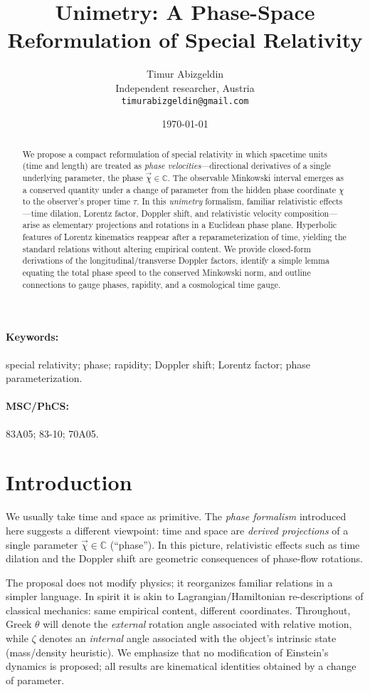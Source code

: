 \documentclass[11pt]{article}
\title{Unimetry: A Phase-Space Reformulation of Special Relativity}
\author{Timur Abizgeldin\\ \small Independent researcher, Austria\\ \small \texttt{timurabizgeldin@gmail.com}}
\date{\today}
\numberwithin{equation}{section}
\begin{document}
\maketitle

\begin{abstract}
We propose a compact reformulation of special relativity in which spacetime units (time and length) are treated as \emph{phase velocities}---directional derivatives of a single underlying parameter, the phase $\vec{\chi}\in\mathbb{C}$. The observable Minkowski interval emerges as a conserved quantity under a change of parameter from the hidden phase coordinate $\chi$ to the observer's proper time $\tau$. In this \emph{unimetry} formalism, familiar relativistic effects---time dilation, Lorentz factor, Doppler shift, and relativistic velocity composition---arise as elementary projections and rotations in a Euclidean phase plane. Hyperbolic features of Lorentz kinematics reappear after a reparameterization of time, yielding the standard relations without altering empirical content. We provide closed-form derivations of the longitudinal/transverse Doppler factors, identify a simple lemma equating the total phase speed to the conserved Minkowski norm, and outline connections to gauge phases, rapidity, and a cosmological time gauge.
\end{abstract}

\paragraph{Keywords:} special relativity; phase; rapidity; Doppler shift; Lorentz factor; phase parameterization.

\paragraph{MSC/PhCS:} 83A05; 83-10; 70A05.

\section{Introduction}
We usually take time and space as primitive. The \emph{phase formalism} introduced here suggests a different viewpoint: time and space are \emph{derived projections} of a single parameter $\vec{\chi}\in\mathbb{C}$ (``phase''). In this picture, relativistic effects such as time dilation and the Doppler shift are geometric consequences of phase-flow rotations.

The proposal does not modify physics; it reorganizes familiar relations in a simpler language. In spirit it is akin to Lagrangian/Hamiltonian re-descriptions of classical mechanics: same empirical content, different coordinates. Throughout, Greek $\theta$ will denote the \emph{external} rotation angle associated with relative motion, while $\zeta$ denotes an \emph{internal} angle associated with the object's intrinsic state (mass/density heuristic). We emphasize that no modification of Einstein's dynamics is proposed; all results are kinematical identities obtained by a change of parameter.
\end{document}
